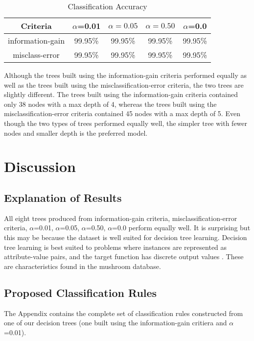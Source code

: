 \documentclass{IEEEtran}
\begin{document}
\begin{table}[ht]
  \caption{Classification Accuracy}
  \centering
  \begin{tabular}{c c c c c}
  \hline\hline
  Criteria & $\alpha$=0.01 & $\alpha=0.05$ & $\alpha=0.50$ & $\alpha$=0.0 \\ [0.5ex]
  \hline
  information-gain & 99.95\% & 99.95\% & 99.95\% & 99.95\% \\
  misclass-error   & 99.95\% & 99.95\% & 99.95\% & 99.95\% \\ [1ex]
  \hline
  \end{tabular}
  \label{table:nonlin}
\end{table}

Although the trees built using the information-gain criteria performed
equally as well as the trees built using the misclassification-error
criteria, the two trees are slightly different. The trees built using
the information-gain criteria contained only 38 nodes with a max depth
of 4, whereas the trees built using the misclassification-error
criteria contained 45 nodes with a max depth of 5. Even though the two
types of trees performed equally well, the simpler tree with fewer
nodes and smaller depth is the preferred model.

\section{Discussion}
\subsection{Explanation of Results}
All eight trees produced from information-gain criteria,
misclassification-error criteria, $\alpha$=0.01, $\alpha$=0.05, $\alpha$=0.50,
$\alpha$=0.0 perform equally well. It is surprising but this may be because
the dataset is well suited for decision tree learning. Decision tree
learning is best suited to problems where instances are represented as
attribute-value pairs, and the target function has discrete output
values \parencite{mitchell1997machine}. These are characteristics
found in the mushroom database.

\subsection{Proposed Classification Rules}
The Appendix contains the complete set of classification rules
constructed from one of our decision trees (one built using the
information-gain critiera and $\alpha$=0.01). 
\end{document}
